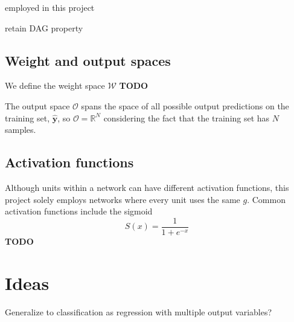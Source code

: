 \documentclass[oneside]{book}
\renewcommand\vec{\mathbf}
\newcommand{\todo}{{\color{red} \textbf{TODO} }}
\begin{document}
employed in this project

retain DAG property




\section{Weight and output spaces}
We define the weight space $\mathcal{W}$ \todo

The output space $\mathcal{O}$ spans the space of all possible output predictions on the training set, $\vec{\hat{y}}$, so $\mathcal{O}=\mathbb{R}^N$ considering the fact that the training set has $N$ samples.

\section{Activation functions}
\label{sec:activation_functions}
Although units within a network can have different activation functions, this project solely employs networks where every unit uses the same $g$. 
Common activation functions include the sigmoid
\begin{equation}
    S(x) = \frac{1}{1 + e^{-x}}
\end{equation}
\todo

\chapter*{Ideas}
Generalize to classification as regression with multiple output variables?



\end{document}
